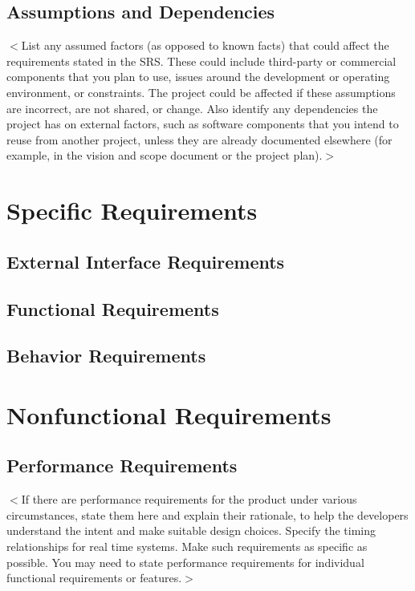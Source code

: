 \documentclass{scrreprt}
\begin{document}
\section{Assumptions and Dependencies}
$<$List any assumed factors (as opposed to known facts) that could affect the
requirements stated in the SRS. These could include third-party or commercial
components that you plan to use, issues around the development or operating
environment, or constraints. The project could be affected if these assumptions
are incorrect, are not shared, or change. Also identify any dependencies the
project has on external factors, such as software components that you intend to
reuse from another project, unless they are already documented elsewhere (for
example, in the vision and scope document or the project plan).$>$


\chapter{Specific Requirements}

\section{External Interface Requirements}

\section{Functional Requirements}

\section{Behavior Requirements}


\chapter{Nonfunctional Requirements}

\section{Performance Requirements}
$<$If there are performance requirements for the product under various
circumstances, state them here and explain their rationale, to help the
developers understand the intent and make suitable design choices. Specify the
timing relationships for real time systems. Make such requirements as specific
as possible. You may need to state performance requirements for individual
functional requirements or features.$>$
\end{document}
